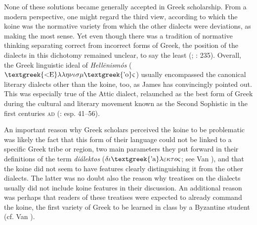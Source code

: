 \documentclass[output=paper]{langsci/langscibook}
\begin{document}
None of these solutions became generally accepted in Greek scholarship. From a modern perspective, one might regard the third view, according to which the koine was the normative variety from which the other dialects were deviations, as making the most sense. Yet even though there was a tradition of normative thinking separating correct from incorrect forms of Greek, the position of the dialects in this dichotomy remained unclear, to say the least (\citealt{Versteegh1986}; \citealt{Dickey2007}: 235). Overall, the Greek linguistic ideal of \textit{Hellēnismós} ($\text{\textgreek{<E}}\lambda \lambda \eta \nu \iota \sigma \mu \text{\textgreek{'o}}\varsigma $) usually encompassed the canonical literary dialects other than the koine, too, as James \citet{Clackson2015} has convincingly pointed out. This was especially true of the Attic dialect, relaunched as the best form of Greek during the cultural and literary movement known as the Second Sophistic in the first centuries \textsc{ad} (\citealt{Whitmarsh2005}: esp. 41–56).

An important reason why Greek scholars perceived the koine to be problematic was likely the fact that this form of their language could not be linked to a specific Greek tribe or region, two main parameters they put forward in their definitions of the term \textit{diálektos} ($\delta \iota \text{\textgreek{'a}}\lambda \varepsilon \kappa \tau o\varsigma $; see Van \citealt{Rooy2016d}), and that the koine did not seem to have features clearly distinguishing it from the other dialects. The latter was no doubt also the reason why treatises on the dialects usually did not include koine features in their discussion. An additional reason was perhaps that readers of these treatises were expected to already command the koine, the first variety of Greek to be learned in class by a Byzantine student (cf. Van \citealt{Rooy2016b}).
\end{document}
